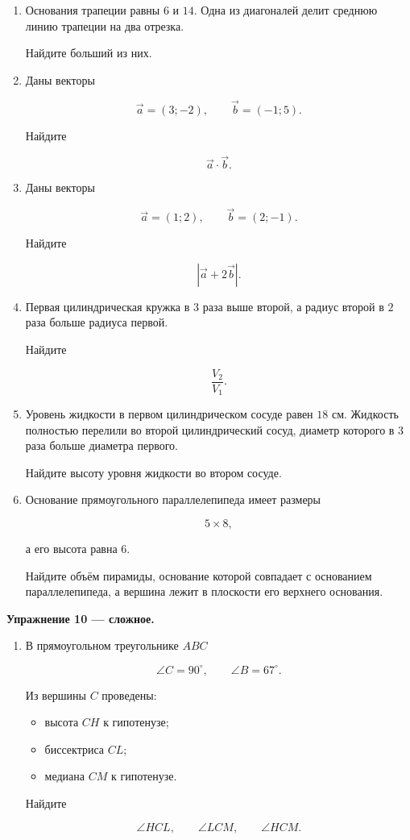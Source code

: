 \documentclass[a4paper,12pt]{article}
\begin{document}
\begin{enumerate}[resume]

\item
Основания трапеции равны \(6\) и \(14\).
Одна из диагоналей делит среднюю линию трапеции на два отрезка.

Найдите больший из них.

\item
Даны векторы

\[
\vec a=(3;-2),
\qquad
\vec b=(-1;5).
\]

Найдите

\[
\vec a\cdot\vec b.
\]

\item
Даны векторы

\[
\vec a=(1;2),
\qquad
\vec b=(2;-1).
\]

Найдите

\[
|\vec a+2\vec b|.
\]

\item
Первая цилиндрическая кружка в \(3\) раза выше второй, а радиус второй в \(2\) раза больше радиуса первой.

Найдите

\[
\frac{V_2}{V_1}.
\]

\item
Уровень жидкости в первом цилиндрическом сосуде равен \(18\) см.
Жидкость полностью перелили во второй цилиндрический сосуд, диаметр которого в \(3\) раза больше диаметра первого.

Найдите высоту уровня жидкости во втором сосуде.

\item
Основание прямоугольного параллелепипеда имеет размеры

\[
5\times8,
\]

а его высота равна \(6\).

Найдите объём пирамиды, основание которой совпадает с основанием параллелепипеда, а вершина лежит в плоскости его верхнего основания.

\end{enumerate}

\vspace{3mm}

\textbf{Упражнение 10 --- сложное.}

\begin{enumerate}[resume]

\item
В прямоугольном треугольнике \(ABC\)

\[
\angle C=90^\circ,
\qquad
\angle B=67^\circ.
\]

Из вершины \(C\) проведены:

\begin{itemize}
  \item высота \(CH\) к гипотенузе;
  \item биссектриса \(CL\);
  \item медиана \(CM\) к гипотенузе.
\end{itemize}

Найдите

\[
\angle HCL,
\qquad
\angle LCM,
\qquad
\angle HCM.
\]

\end{enumerate}
\end{document}
